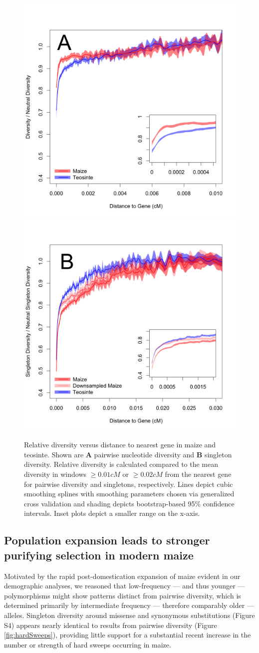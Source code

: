 \documentclass[12pt,a4paper]{article}
\begin{document}
\begin{figure}[!tb]
\centering
\includegraphics[width=.45\textwidth]{FigsAndFiles/distanceToGene_WithSignificance_Folded2_manuscript.png} \includegraphics[width=.45\textwidth]{FigsAndFiles/distanceToGene_WithSignificance_Singletons_Downsampled_threeLines_manuscript.png}
\caption{Relative diversity versus distance to nearest gene in maize and teosinte. 
Shown are \textbf{A} pairwise nucleotide diversity and \textbf{B} singleton diversity.  
Relative diversity is calculated compared to the mean diversity in windows $\geq 0.01 cM$ or $\geq 0.02 cM$ from the nearest
gene for pairwise diversity and singletons, respectively. 
  Lines depict cubic smoothing splines with smoothing parameters chosen via generalized cross validation and shading depicts bootstrap-based 95\% confidence intervals.
  Inset plots depict a smaller range on the x-axis. \label{fig:purify}
  }
\end{figure}

\subsection*{Population expansion leads to stronger purifying selection in modern maize} %
Motivated by the rapid post-domestication expansion of maize evident in our demographic analyses, we reasoned that low-frequency --- and thus younger --- polymorphisms might show patterns distinct from pairwise diversity, which is determined primarily by intermediate frequency --- therefore comparably older --- alleles. 
Singleton diversity around missense and synonymous substitutions (Figure S4) appears nearly identical to results from pairwise diversity (Figure \ref{fig:hardSweeps}), providing little support for a substantial recent increase in the number or strength of hard sweeps occurring in maize. 
\end{document}
